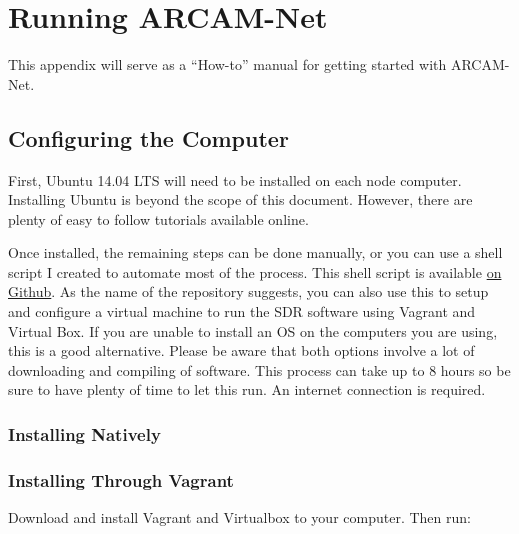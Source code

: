 
\chapter{Running ARCAM-Net} %

\label{AppendixA} %

This appendix will serve as a ``How-to'' manual for getting started with ARCAM-Net. 

\section{Configuring the Computer}

First, Ubuntu 14.04 LTS will need to be installed on each node computer. Installing Ubuntu is beyond the scope of this document. However, there are plenty of easy to follow tutorials available online. 

Once installed, the remaining steps can be done manually, or you can use a shell script I created to automate most of the process. This shell script is available \href{https://github.com/jmccormack200/GnuRadio-Vagrant-Script}{on Github}. As the name of the repository suggests, you can also use this to setup and configure a virtual machine to run the SDR software using Vagrant and Virtual Box. If you are unable to install an OS on the computers you are using, this is a good alternative. Please be aware that both options involve a lot of downloading and compiling of software. This process can take up to 8 hours so be sure to have plenty of time to let this run. An internet connection is required. 

\subsection{Installing Natively}



\subsection{Installing Through Vagrant}

Download and install Vagrant and Virtualbox to your computer. Then run:


